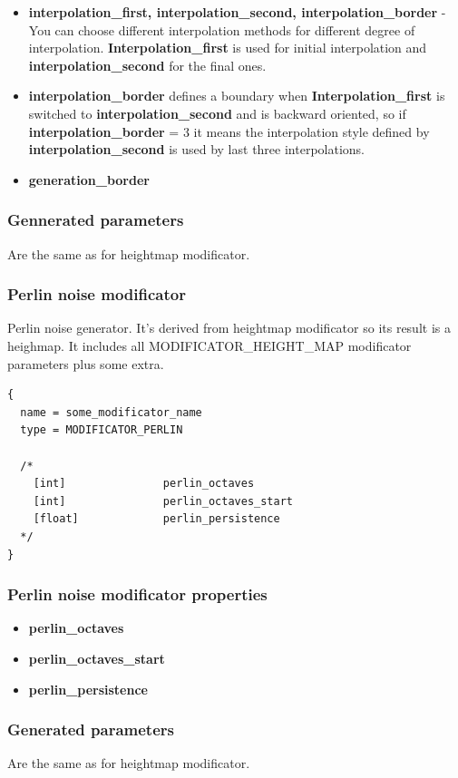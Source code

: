 \documentclass[9pt]{article}
\begin{document}
\begin{itemize}
\begin{itemize}
\end{itemize}
\item{\bf interpolation\_first, interpolation\_second, \bf interpolation\_border}
- You can choose different interpolation methods for different degree of interpolation. 
{\bf Interpolation\_first} is used for initial interpolation and 
{\bf interpolation\_second} for the final ones. 
\item{\bf interpolation\_border}
defines a boundary when {\bf Interpolation\_first} is switched to {\bf interpolation\_second} 
and is backward oriented, so if {\bf interpolation\_border} = 3 it means the interpolation
style defined by {\bf interpolation\_second} is used by last three interpolations.
\item{\bf generation\_border}
\end{itemize}

\subsubsection*{Gennerated parameters}

Are the same as for heightmap modificator.

\subsubsection{Perlin noise modificator}

Perlin noise generator. It's derived from heightmap modificator
so its result is a heighmap. It includes all MODIFICATOR\_HEIGHT\_MAP modificator 
parameters plus some extra.

\begin{verbatim}
{
  name = some_modificator_name
  type = MODIFICATOR_PERLIN

  /*
    [int]               perlin_octaves
    [int]               perlin_octaves_start
    [float]             perlin_persistence
  */
}
\end{verbatim}
\subsubsection*{Perlin noise modificator properties}
\begin{itemize}
\item{\bf perlin\_octaves}
\item{\bf perlin\_octaves\_start}
\item{\bf perlin\_persistence}
\end{itemize}

\subsubsection*{Generated parameters}
Are the same as for heightmap modificator.
\end{document}

